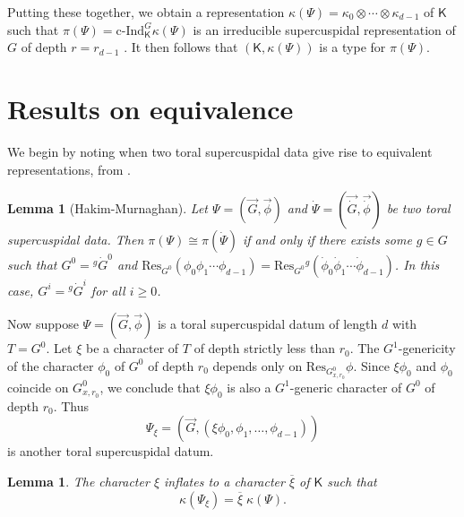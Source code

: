\documentclass[12pt]{amsart}
\newcommand{\Res}{\mathrm{Res}} %
\newcommand{\cind}{\textrm{c-}\mathrm{Ind}} %
\newcommand{\KT}{\mathsf{K}}
\theoremstyle{plain}
\newtheorem{lemma}[theorem]{Lemma}
\theoremstyle{definition}
\theoremstyle{remark}
\numberwithin{equation}{section}
\numberwithin{figure}{section}
\begin{document}
Putting these together, we obtain a representation $\kappa(\Psi)= \kappa_{0}\otimes \cdots \otimes \kappa_{d-1}$ of $\KT$ such that $\pi (\Psi) = \cind_{\KT}^G \kappa(\Psi)$ is an irreducible supercuspidal representation of $G$ of depth $r=r_{d-1}$ \cite[Theorem 15.1]{Yu2001}.  It then follows that $(\KT,\kappa(\Psi))$ is a type for $\pi(\Psi)$.


\section{Results on equivalence}\label{strategy}

We begin by noting when two toral supercuspidal data give rise to equivalent representations, from \cite[Cor 6.10]{HakimMurnaghan2008}.     

\begin{lemma}[Hakim-Murnaghan] \label{HMCor}
Let $\Psi = (\vec{G},\vec{\phi})$ and $\dot\Psi = (\vec{\dot{G}}, \vec{\dot{\phi}})$ be two toral supercuspidal data.  Then  $\pi(\Psi) \cong \pi(\dot\Psi)$ if and only if there exists some $g\in G$ such that $G^0 = {}^g\dot{G}^0$ and $\Res_{G^0}(\phi_0 \phi_1 \cdots \phi_{d-1})=\Res_{G^0}{}^g(\dot{\phi}_0 \dot{\phi}_1 \cdots \dot{\phi}_{d-1})$.   In this case, $G^i={}^g\dot{G}^i$ for all $i\geq 0$.
\end{lemma}

Now suppose $\Psi = (\vec{G},\vec{\phi})$ is a toral supercuspidal datum of length $d$ with $T=G^0$.  Let $\xi$ be a character of $T$ of depth strictly less than $r_0$.  The $G^1$-genericity of the character $\phi_0$ of $G^0$ of depth $r_0$ depends only on $\Res_{G^0_{x,r_0}}\phi$.   Since $\xi\phi_0$ and $\phi_0$ coincide on $G^0_{x,r_0}$, we conclude that $\xi\phi_0$ is also a $G^1$-generic character of $G^0$ of depth $r_0$. Thus
$$
\Psi_\xi = (\vec{G}, (\xi\phi_0, \phi_1,\ldots, \phi_{d-1}))
$$
is another toral supercuspidal datum.

\begin{lemma}\label{L:Murn}
The character $\xi$ inflates to a character $\overline{\xi}$ of $\KT$ such that
$$
\kappa(\Psi_\xi) = \overline{\xi}\;\kappa(\Psi).
$$
\end{lemma}
\end{document}
